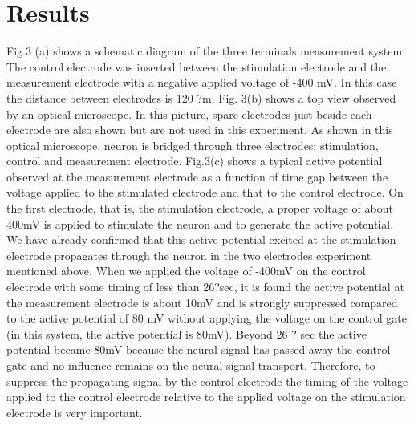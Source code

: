 \documentclass[twocolumn]{htl-author}
\begin{document}
\section{Results}
Fig.3 (a) shows a schematic diagram of the three terminals measurement system. The control electrode was inserted between the stimulation electrode and the measurement electrode with a negative applied voltage of -400 mV. In this case the distance between electrodes is 120 ?m. Fig. 3(b) shows a top view observed by an optical microscope. In this picture, spare electrodes just beside each electrode are also shown but are not used in this experiment. As shown in this optical microscope, neuron is bridged through three electrodes; stimulation, control and measurement electrode.
Fig.3(c) shows a typical active potential observed at the measurement electrode as a function of time gap between the voltage applied to the stimulated electrode and that to the control electrode. On the first electrode, that is, the stimulation electrode, a proper voltage of about 400mV is applied to stimulate the neuron and to generate the active potential. We have already confirmed that this active potential excited at the stimulation electrode propagates through the neuron in the two electrodes experiment mentioned above. When we applied the voltage of -400mV on the control electrode with some timing of less than 26?sec, it is found the active potential at the measurement electrode is about 10mV and is strongly suppressed compared to the active potential of 80 mV without applying the voltage on the control gate (in this system, the active potential is 80mV). Beyond 26 ? sec the active potential became 80mV because the neural signal has passed away the control gate and no influence remains on the neural signal transport. Therefore, to suppress the propagating signal by the control electrode the timing of the voltage applied to the control electrode relative to the applied voltage on the stimulation electrode is very important.
\end{document}
